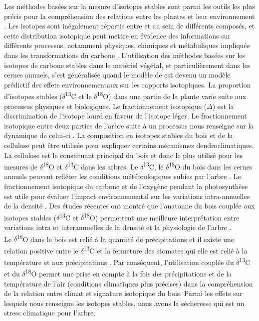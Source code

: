 \documentclass[a4paper,12pt]{report}
\newcommand{\Ctreize}{$\delta$\textsuperscript{13}C\xspace}
\newcommand{\Odixhuit}{$\delta$\textsuperscript{18}O\xspace}
\begin{document}
Les méthodes basées sur la mesure d'isotopes stables sont parmi les outils les plus précis pour la compréhension des relations entre les plantes et leur environnement \citep{Dawson2002}. Les isotopes sont inégalement répartis entre et au sein de différents composés, et cette distribution isotopique peut mettre en évidence des informations sur différents processus, notamment physiques, chimiques et métaboliques impliqués dans les transformations du carbone \citep{Farquhar1989}. L'utilisation des méthodes basées sur les isotopes de carbone stables dans le matériel végétal, et particulièrement dans les cernes annuels, s'est généralisée quand le modèle de \cite{Farquhar1989} est devenu un modèle prédictif des effets environnementaux sur les rapports isotopiques. La proportion d'isotopes stables (\Ctreize et le \Odixhuit) dans une partie de la plante varie suite aux processus physiques et biologiques. Le fractionnement isotopique ($\Delta$) est la discrimination de l'isotope lourd en faveur de l'isotope léger. Le fractionnement isotopique entre deux parties de l'arbre suite à un processus nous renseigne sur la dynamique de celui-ci \citep{Farquhar1989}. La composition en isotopes stables du bois et de la cellulose peut être utilisée pour expliquer certains mécanismes dendroclimatiques. La cellulose est le constituant principal du bois et donc le plus utilisé pour les mesures de \Odixhuit et \Ctreize dans les arbres. Le \Ctreize, le \Odixhuit du bois dans les cernes annuels peuvent refléter les conditions météorologiques subies par l'arbre \citep{Duquesnay1998,McCarroll2004,Hartl-meier2015}. Le fractionnement isotopique du carbone et de l'oxygène pendant la photosynthèse est utile pour évaluer l'impact environnemental sur les variations intra-annuelles de la densité \citep{Farquhar1989,JonLloyd1994}. Des études récentes ont montré que l'anatomie du bois couplée aux isotopes stables (\Ctreize et \Odixhuit) permettent une meilleure interprétation entre variations intra et interannuelles de la densité et la physiologie de l'arbre \citep{Micco2007,Vaganov2009,Sarris2013}. \\

Le \Odixhuit dans le bois est relié à la quantité de précipitations \citep{Bonal2000} et il existe une relation positive entre le \Ctreize et la fermeture des stomates qui elle est relié à la température et aux précipitations \citep{Pons2011}. Par conséquent, l'utilisation couplée du \Ctreize et du \Odixhuit permet une prise en compte à la fois des précipitations et de la température de l'air (conditions climatiques plus précises) dans la compréhension de la relation entre climat et signature isotopique du bois. Parmi les effets sur lesquels nous renseigne les isotopes stables, nous avons la sécheresse qui est un stress climatique pour l'arbre.\\ 
\end{document}
